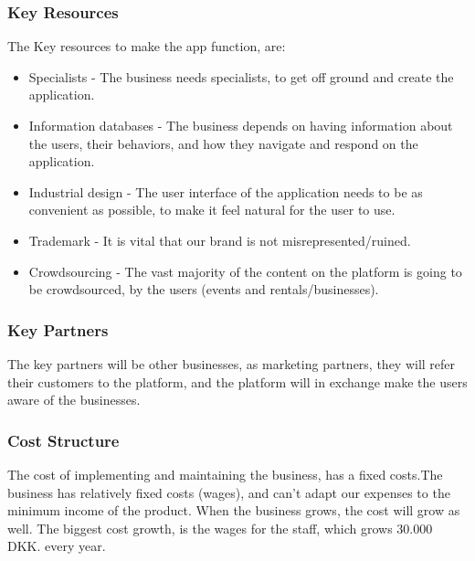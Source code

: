 \subsubsection{Key Resources}
The Key resources to make the app function, are:
\begin{itemize}
	\item Specialists - The business needs specialists, to get off ground and create the application.
	\item Information databases - The business depends on having information about the users, their behaviors, and how they navigate and respond on the application.
	\item Industrial design - The user interface of the application needs to be as convenient as possible, to make it feel natural for the user to use.
	\item Trademark - It is vital that our brand is not misrepresented/ruined.
	\item Crowdsourcing - The vast majority of the content on the platform is going to be crowdsourced, by the users (events and rentals/businesses).
\end{itemize}

\subsubsection{Key Partners}
The key partners will be other businesses, as marketing partners, they will refer their customers to the platform, and the platform will in exchange make the users aware of the businesses.

\subsubsection{Cost Structure}
The cost of implementing and maintaining the business, has a fixed costs.The business has relatively fixed costs (wages), and can't adapt our expenses to the minimum income of the product. When the business grows, the cost will grow as well. The biggest cost growth, is the wages for the staff, which grows 30.000 DKK. every year. 

